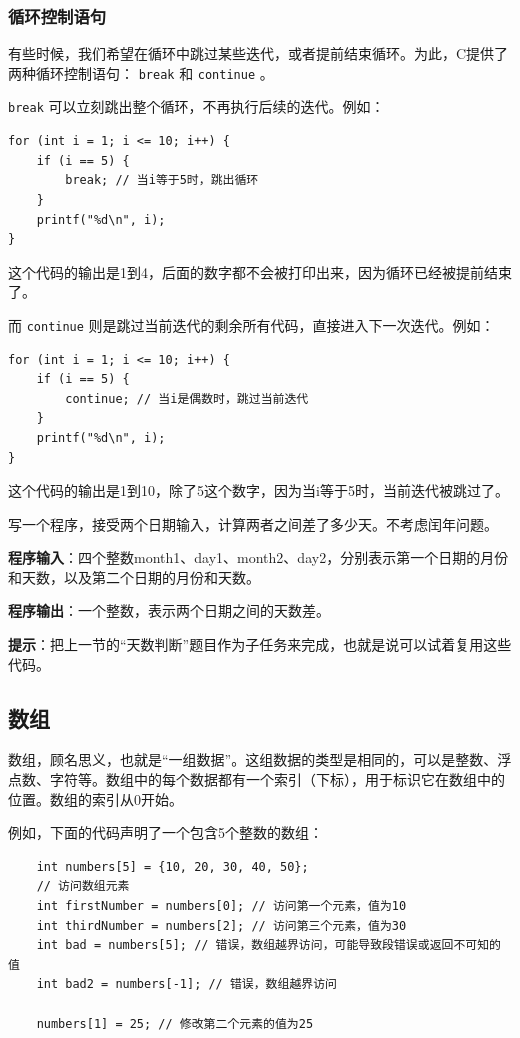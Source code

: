 \subsubsection{循环控制语句}

有些时候，我们希望在循环中跳过某些迭代，或者提前结束循环。为此，C提供了两种循环控制语句： \texttt{break} 和 \texttt{continue} 。

\texttt{break} 可以立刻跳出整个循环，不再执行后续的迭代。例如：
\begin{verbatim}
for (int i = 1; i <= 10; i++) {
    if (i == 5) {
        break; // 当i等于5时，跳出循环
    }
    printf("%d\n", i);
}
\end{verbatim}
这个代码的输出是1到4，后面的数字都不会被打印出来，因为循环已经被提前结束了。

而 \texttt{continue} 则是跳过当前迭代的剩余所有代码，直接进入下一次迭代。例如：
\begin{verbatim}
for (int i = 1; i <= 10; i++) {
    if (i == 5) {
        continue; // 当i是偶数时，跳过当前迭代
    }
    printf("%d\n", i);
}
\end{verbatim}
这个代码的输出是1到10，除了5这个数字，因为当i等于5时，当前迭代被跳过了。

\begin{exercise}[日期差]
    写一个程序，接受两个日期输入，计算两者之间差了多少天。不考虑闰年问题。

    \textbf{程序输入}：四个整数month1、day1、month2、day2，分别表示第一个日期的月份和天数，以及第二个日期的月份和天数。

    \textbf{程序输出}：一个整数，表示两个日期之间的天数差。

    \textbf{提示}：把上一节的“天数判断”题目作为子任务来完成，也就是说可以试着复用这些代码。
\end{exercise}

\subsection{数组}

数组，顾名思义，也就是“一组数据”。这组数据的类型是相同的，可以是整数、浮点数、字符等。数组中的每个数据都有一个索引（下标），用于标识它在数组中的位置。数组的索引从0开始。

例如，下面的代码声明了一个包含5个整数的数组：

\begin{verbatim}
    int numbers[5] = {10, 20, 30, 40, 50};
    // 访问数组元素
    int firstNumber = numbers[0]; // 访问第一个元素，值为10
    int thirdNumber = numbers[2]; // 访问第三个元素，值为30
    int bad = numbers[5]; // 错误，数组越界访问，可能导致段错误或返回不可知的值
    int bad2 = numbers[-1]; // 错误，数组越界访问

    numbers[1] = 25; // 修改第二个元素的值为25
\end{verbatim}

